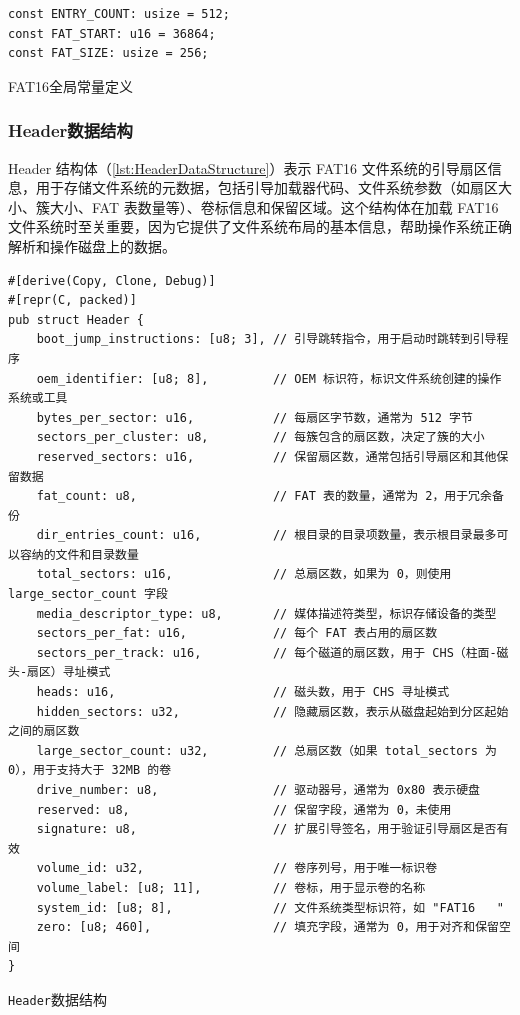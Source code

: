 \begin{listing}[htbp]
    \begin{verbatim}
const ENTRY_COUNT: usize = 512;
const FAT_START: u16 = 36864;
const FAT_SIZE: usize = 256;
    \end{verbatim}
    \caption{FAT16全局常量定义}\label{lst:FAT16GlobalConstantDefinitions}
\end{listing}

\subsubsection{Header数据结构}

Header 结构体（\cref{lst:HeaderDataStructure}）表示 FAT16 文件系统的引导扇区信息，用于存储文件系统的元数据，包括引导加载器代码、文件系统参数（如扇区大小、簇大小、FAT 表数量等）、卷标信息和保留区域。这个结构体在加载 FAT16 文件系统时至关重要，因为它提供了文件系统布局的基本信息，帮助操作系统正确解析和操作磁盘上的数据。

\begin{listing}[htbp]
    \begin{verbatim}
#[derive(Copy, Clone, Debug)]
#[repr(C, packed)]
pub struct Header {
    boot_jump_instructions: [u8; 3], // 引导跳转指令，用于启动时跳转到引导程序
    oem_identifier: [u8; 8],         // OEM 标识符，标识文件系统创建的操作系统或工具
    bytes_per_sector: u16,           // 每扇区字节数，通常为 512 字节
    sectors_per_cluster: u8,         // 每簇包含的扇区数，决定了簇的大小
    reserved_sectors: u16,           // 保留扇区数，通常包括引导扇区和其他保留数据
    fat_count: u8,                   // FAT 表的数量，通常为 2，用于冗余备份
    dir_entries_count: u16,          // 根目录的目录项数量，表示根目录最多可以容纳的文件和目录数量
    total_sectors: u16,              // 总扇区数，如果为 0，则使用 large_sector_count 字段
    media_descriptor_type: u8,       // 媒体描述符类型，标识存储设备的类型
    sectors_per_fat: u16,            // 每个 FAT 表占用的扇区数
    sectors_per_track: u16,          // 每个磁道的扇区数，用于 CHS（柱面-磁头-扇区）寻址模式
    heads: u16,                      // 磁头数，用于 CHS 寻址模式
    hidden_sectors: u32,             // 隐藏扇区数，表示从磁盘起始到分区起始之间的扇区数
    large_sector_count: u32,         // 总扇区数（如果 total_sectors 为 0），用于支持大于 32MB 的卷
    drive_number: u8,                // 驱动器号，通常为 0x80 表示硬盘
    reserved: u8,                    // 保留字段，通常为 0，未使用
    signature: u8,                   // 扩展引导签名，用于验证引导扇区是否有效
    volume_id: u32,                  // 卷序列号，用于唯一标识卷
    volume_label: [u8; 11],          // 卷标，用于显示卷的名称
    system_id: [u8; 8],              // 文件系统类型标识符，如 "FAT16   "
    zero: [u8; 460],                 // 填充字段，通常为 0，用于对齐和保留空间
}
    \end{verbatim}
    \caption{\texttt{Header}数据结构}\label{lst:HeaderDataStructure}
\end{listing}

